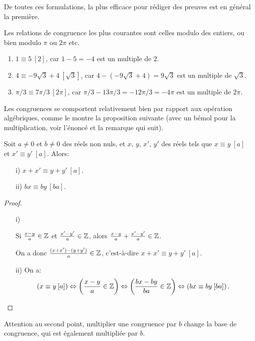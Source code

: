 De toutes ces formulations, la plus efficace pour rédiger des preuves est en général la première.

Les relations de congruence les plus courantes sont celles modulo des entiers, ou bien modulo $\pi$ ou $2\pi$ etc.


\begin{exemples}
\begin{enumerate}[label=\alph*)]
\item $1 \equiv 5 \: [2]$, car $1-5 = -4$ est un multiple de $2$.
\item $4\equiv -9\sqrt{3}+4 \: [\sqrt{3}]$, car $4 - (-9\sqrt{3}+4) = 9\sqrt{3}$ est un multiple de $\sqrt{3}$.
\item $\pi/3 \equiv 7\pi/3 \: [2\pi]$, car $\pi/3 - 13\pi/3 = -12\pi/3 = -4\pi$ est un multiple de $2\pi$.
\end{enumerate}
\end{exemples}

Les congruences se comportent relativement bien par rapport aux opération algébriques, comme le montre la proposition suivante (avec un bémol pour la multiplication, voir l'énoncé et la remarque qui suit).

\begin{proposition} Soit $a\neq 0$ et $b\neq 0$ des réels non nuls, et $x$, $y$, $x'$, $y'$ des réels tels que $x \equiv y\: [a]$ et $x' \equiv y'\: [a]$. Alors:
\begin{itemize}
\item[i)]{$x+x' \equiv y+y'\: [a]$.}
\item[ii)]{$bx\equiv by \: [ba]$.}
\end{itemize}
\end{proposition}
\begin{proof}
\begin{itemize}
\item[i)]{Si $\frac{x-y}{a} \in \mathbb{Z}$ et $\frac{x'-y'}{a} \in \mathbb{Z}$, alors $\frac{x-y}{a}+\frac{x'-y'}{a} \in \mathbb{Z}$.

On a donc $\frac{(x+x')-(y+y')}{a} \in \mathbb{Z}$, c'est-à-dire $x+x' \equiv y+y'\: [a]$.}
\item[ii)]{On a:
\[\left(x\equiv y \: [a]\right) \Leftrightarrow  \left(\frac{x-y}{a} \in \mathbb{Z}\right) \Leftrightarrow \left(\frac{bx-by}{ba} \in \mathbb{Z}\right) \Leftrightarrow \left(bx\equiv by \: [ba]\right).\]}
\end{itemize}
\end{proof}

\begin{remarque}
Attention au second point, multiplier une congruence par $b$ change la base de congruence, qui est également multipliée par $b$.
\end{remarque}

